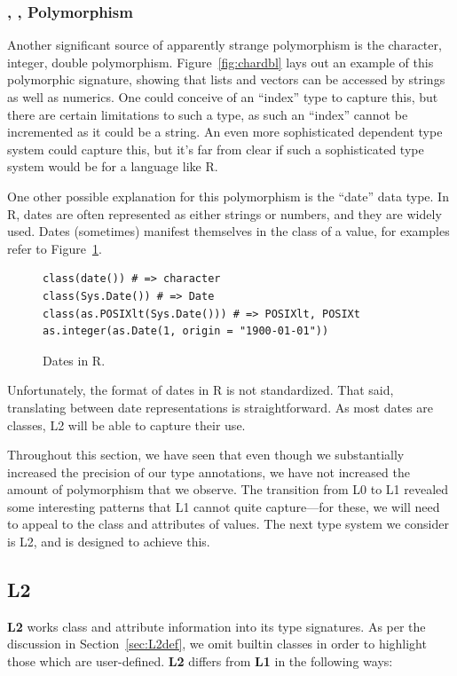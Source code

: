 \documentclass[acmsmall,10pt,review,anonymous]{acmart}\settopmatter{printfolios=true,printccs=false,printacmref=false}
\begin{document}
%
%
\subsubsection{\C, \I, \D Polymorphism}
Another significant source of apparently strange polymorphism is the character, integer, double polymorphism.
Figure~\ref{fig:chardbl} lays out an example of this polymorphic signature, showing that lists and vectors can be accessed by strings as well as numerics.
One could conceive of an ``index'' type to capture this, but there are certain limitations to such a type, as such an ``index'' cannot be incremented as it could be a string.
An even more sophisticated dependent type system could capture this, but it's far from clear if such a sophisticated type system would be for a language like R.

One other possible explanation for this polymorphism is the ``date'' data type.
In R, dates are often represented as either strings or numbers, and they are widely used.
Dates (sometimes) manifest themselves in the class of a value, for examples refer to Figure~\ref{fig:date}.
\begin{figure}[!hb]{\small\begin{lstlisting}[style=R]
class(date()) # => character
class(Sys.Date()) # => Date
class(as.POSIXlt(Sys.Date())) # => POSIXlt, POSIXt
as.integer(as.Date(1, origin = "1900-01-01"))
\end{lstlisting}}\caption{Dates in R.}\label{fig:date}\end{figure}

Unfortunately, the format of dates in R is not standardized.
That said, translating between date representations is straightforward.
As most dates are classes, L2 will be able to capture their use.

Throughout this section, we have seen that even though we substantially increased the precision of our type annotations, we have not increased the amount of polymorphism that we observe.
The transition from L0 to L1 revealed some interesting patterns that L1 cannot quite capture---for these, we will need to appeal to the class and attributes of values.
The next type system we consider is L2, and is designed to achieve this.

%
%
%
%
\subsection{L2}

{\bf L2} works class and attribute information into its type signatures.
As per the discussion in Section~\ref{sec:L2def}, we omit builtin classes in order to highlight those which are user-defined.
{\bf L2} differs from {\bf L1} in the following ways:
\end{document}
